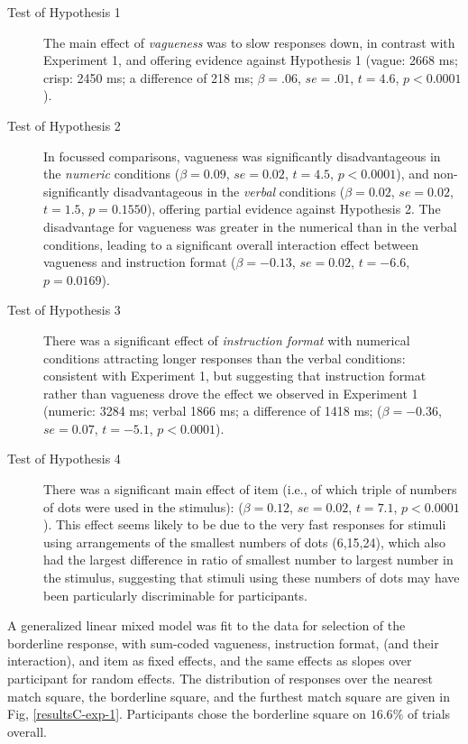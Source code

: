 \begin{description}
	\item [Test of Hypothesis 1] The main effect of \emph{vagueness} was to slow responses down, in contrast with Experiment 1, and offering evidence against Hypothesis 1 (vague: 2668 ms; crisp: 2450 ms; a difference of 218 ms; $\beta=.06$, $se=.01$, $t=4.6$, $p<0.0001$). 
	\item [Test of Hypothesis 2] In focussed comparisons, vagueness was significantly disadvantageous in the \emph{numeric} conditions ($\beta=0.09$, $se=0.02$, $t=4.5$, $p<0.0001$), and non-significantly disadvantageous in the \emph{verbal} conditions ($\beta=0.02$, $se=0.02$, $t=1.5$, $p=0.1550$), offering partial evidence against Hypothesis 2. The disadvantage for vagueness was greater in the numerical than in the verbal conditions, leading to a significant overall interaction effect between vagueness and instruction format ($\beta=-0.13$, $se=0.02$, $t=-6.6$, $p=0.0169$).
	\item [Test of Hypothesis 3] There was a significant effect of \emph{instruction format} with numerical conditions attracting longer responses than the verbal conditions: consistent with Experiment 1, but suggesting that instruction format rather than vagueness drove the effect we observed in Experiment 1 (numeric: 3284 ms; verbal 1866 ms; a difference of 1418 ms; ($\beta=-0.36$, $se=0.07$, $t=-5.1$, $p<0.0001$).
	\item [Test of Hypothesis 4] There was a significant main effect of item (i.e., of which triple of numbers of dots were used in the stimulus): ($\beta=0.12$, $se=0.02$, $t=7.1$, $p<0.0001$). This effect seems likely to be due to the very fast responses for stimuli using arrangements of the smallest numbers of dots (6,15,24), which also had the largest difference in ratio of smallest number to largest number in the stimulus, suggesting that stimuli using these numbers of dots may have been particularly discriminable for participants.
\end{description}

A generalized linear mixed model \citet{jaeger2008categorical} was fit to the data for selection of the borderline response, with sum-coded vagueness, instruction format, (and their interaction), and item as fixed effects, and the same effects as slopes over participant for random effects. The distribution of responses over the nearest match square, the borderline square, and the furthest match square are given in Fig, \ref{resultsC-exp-1}. Participants chose the borderline square on $16.6\%$ of trials overall.

